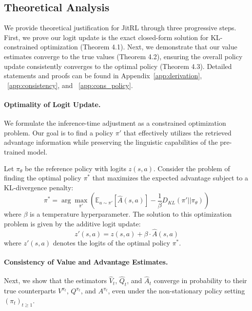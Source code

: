 \subsection{Theoretical Analysis}
\label{subsec:theoretical_analysis}

We provide theoretical justification for JitRL through three progressive steps. First, we prove our logit update is the exact closed-form solution for KL-constrained optimization (Theorem 4.1). Next, we demonstrate that our value estimates converge to the true values (Theorem 4.2), ensuring the overall policy update consistently converges to the optimal policy (Theorem 4.3). Detailed statements and proofs can be found in Appendix~\ref{app:derivation}, ~\ref{app:consistency}, and ~\ref{app:cons_policy}.

\paragraph{Optimality of Logit Update.}
We formulate the inference-time adjustment as a constrained optimization problem. Our goal is to find a policy $\pi'$ that effectively utilizes the retrieved advantage information while preserving the linguistic capabilities of the pre-trained model.

\begin{theorem}
\label{thm:closed_form}
Let $\pi_{\theta}$ be the reference policy with logits $z(s,a)$. Consider the problem of finding the optimal policy $\pi^*$ that maximizes the expected advantage subject to a KL-divergence penalty:
\begin{equation}
    \pi^* = \arg \max_{\pi'} \left( \mathbb{E}_{a \sim \pi'} [\widehat A(s,a)] - \frac{1}{\beta} D_{KL}(\pi' || \pi_{\theta}) \right)
    \label{eq:optimization_objective2}
\end{equation}
where $\beta$ is a temperature hyperparameter. The solution to this optimization problem is given by the additive logit update:
\begin{equation}
    z'(s,a) = z(s,a) + \beta \cdot \widehat A(s,a)
    \label{eq:logit_update_rule}
\end{equation}
where $z'(s,a)$ denotes the logits of the optimal policy $\pi^*$.
\end{theorem}

\paragraph{Consistency of Value and Advantage Estimates.}
Next, we show that the estimators $\widehat{V}_t$, $\widehat{Q}_t$, and $\widehat{A}_t$ converge in probability to their true counterparts $V^{\pi_t}$, $Q^{\pi_t}$, and $A^{\pi_t}$, even under the non-stationary policy setting $(\pi_t)_{t \ge 1}$.

